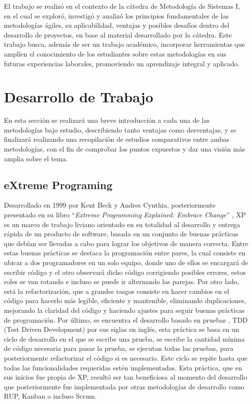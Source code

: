 \documentclass[a4paper,10pt]{article}
\begin{document}
	El trabajo se realizó en el contexto de la cátedra de Metodología de Sistemas I, en el cual se exploró, investigó y analizó los principios fundamentales de las metodologías ágiles, su aplicabilidad, ventajas y posibles desafíos dentro del desarrollo de proyectos, en base al material desarrollado por la cátedra. Este trabajo busca, además de ser un trabajo académico, incorporar herramientas que amplíen el conocimiento de los estudiantes sobre estas metodologías en sus futuras experiencias laborales, promoviendo un aprendizaje integral y aplicado.
	\section{Desarrollo de Trabajo}
	En esta sección se realizará una breve introducción a cada una de las metodologías bajo estudio, describiendo tanto ventajas como desventajas, y se finalizará realizando una recopilación de estudios comparativos entre ambas metodologías, con el fin de comprobar los puntos expuestos y dar una visión más amplia sobre el tema.
	\subsection{eXtreme Programing}
	Desarrollado en 1999 por Kent Beck y Andres Cynthia, posteriormente presentado en su libro “\textit{Extreme Programming Explained: Embrace Change}” \parencite{Beck_Andres_2005}, XP es un marco de trabajo liviano orientado en su totalidad al desarrollo y entrega rápida de un producto de software, basada en un conjunto de buenas prácticas que debían ser llevadas a cabo para lograr los objetivos de manera correcta. Entre estas buenas prácticas se destaca la programación entre pares, la cual consiste en ubicar a dos programadores en un solo equipo, donde uno de ellos se encargará de escribir código y el otro observará dicho código corrigiendo posibles errores, estos roles se van rotando e incluso se puede ir alternando las parejas. Por otro lado, está la refactorización, que a grandes rasgos consiste en hacer cambios en el código para hacerlo más legible, eficiente y mantenible, eliminando duplicaciones, mejorando la claridad del código y haciendo ajustes para seguir buenas prácticas de programación. Por último, se encuentra el desarrollo basado en pruebas  \parencite{Beck_2003}, TDD (Test Driven Development) por sus siglas en inglés, esta práctica se basa en un ciclo de desarrollo en el que se escribe una prueba, se escribe la cantidad mínima de código necesaria para pasar la prueba, se ejecutan todas las pruebas, para posteriormente refactorizar el código si es necesario. Este ciclo se repite hasta que todas las funcionalidades requeridas estén implementadas. Esta práctica, que en sus inicios fue propia de XP, resultó ser tan beneficiosa al momento del desarrollo que posteriormente fue implementada por otras metodologías de desarrollo como RUP, Kanban o incluso Scrum.
	
\end{document}
